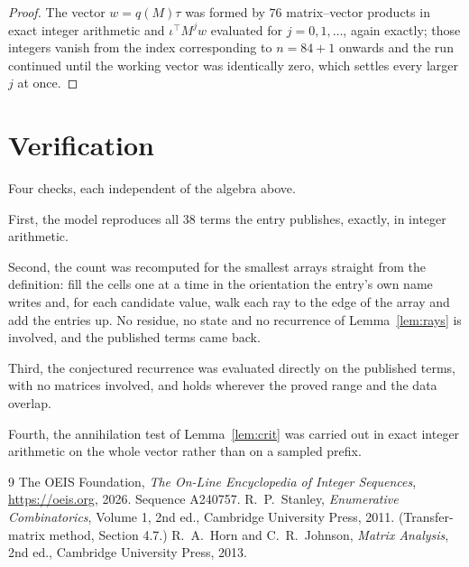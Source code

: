 \documentclass[11pt,a4paper]{article}
\theoremstyle{plain}
\theoremstyle{definition}
\begin{document}
\begin{proof}
The vector $w=q(M)\tau$ was formed by $76$ matrix--vector products in exact integer
arithmetic and $\iota^{\!\top}M^{j}w$ evaluated for $j=0,1,\dots$, again exactly; those
integers vanish from the index corresponding to $n=84+1$ onwards and the run continued
until the working vector was identically zero, which settles every larger $j$ at once.
\end{proof}

\section{Verification}

Four checks, each independent of the algebra above.

First, the model reproduces all $38$ terms the entry publishes, exactly, in integer
arithmetic.

Second, the count was recomputed for the smallest arrays straight from the definition: fill the
cells one at a time in the orientation the entry's own name writes and, for each candidate
value, walk each ray to the edge of the array and add the entries up. No residue, no state and
no recurrence of Lemma~\ref{lem:rays} is involved, and the published terms came back.

Third, the conjectured recurrence was evaluated directly on the published terms, with no
matrices involved, and holds wherever the proved range and the data overlap.

Fourth, the annihilation test of Lemma~\ref{lem:crit} was carried out in exact integer
arithmetic on the whole vector rather than on a sampled prefix.

\begin{thebibliography}{9}
 The OEIS Foundation, \emph{The On-Line Encyclopedia of Integer
Sequences}, \url{https://oeis.org}, 2026. Sequence A240757.
 R.~P.~Stanley, \emph{Enumerative Combinatorics}, Volume 1, 2nd ed.,
Cambridge University Press, 2011. (Transfer-matrix method, Section 4.7.)
 R.~A.~Horn and C.~R.~Johnson, \emph{Matrix Analysis}, 2nd ed., Cambridge
University Press, 2013.
\end{thebibliography}
\end{document}
